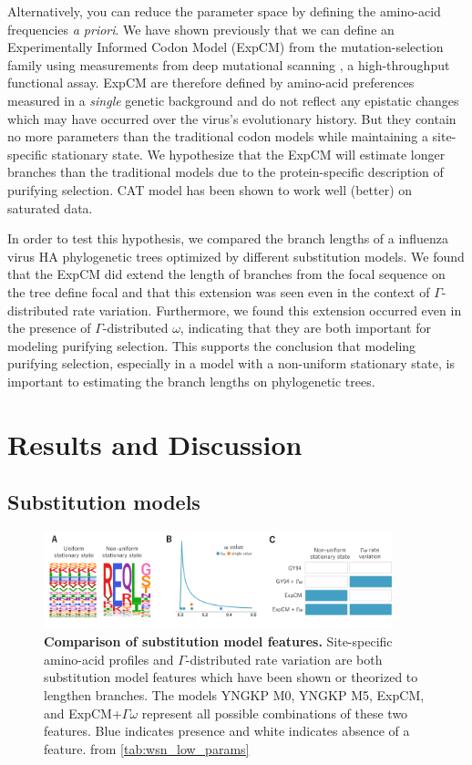 \documentclass[11pt]{article}
\newcommand\skhcomment[1]{{\color{cyan}#1}}
\begin{document}
Alternatively, you can reduce the parameter space by defining the amino-acid frequencies \textit{a priori}. 
We have shown previously that we can define an Experimentally Informed Codon Model (ExpCM) \citep{bloom2014experimentally,bloom2014informed} from the mutation-selection family using measurements from deep mutational scanning \citep{fowler2014deep}, a high-throughput functional assay. 
ExpCM are therefore defined by amino-acid preferences measured in a \textit{single} genetic background and do not reflect any epistatic changes which may have occurred over the virus's evolutionary history. 
But they contain no more parameters than the traditional codon models while maintaining a site-specific stationary state. 
We hypothesize that the ExpCM will estimate longer branches than the traditional models due to the protein-specific description of purifying selection. 
\skhcomment{CAT model has been shown to work well (better) on saturated data.}

In order to test this hypothesis, we compared the branch lengths of a influenza virus HA phylogenetic trees optimized by different substitution models. 
We found that the ExpCM did extend the length of branches from the focal sequence on the tree \skhcomment{define focal} and that this extension was seen even in the context of $\Gamma$-distributed rate variation. 
Furthermore, we found this extension occurred even in the presence of $\Gamma$-distributed $\omega$, indicating that they are both important for modeling purifying selection. 
This supports the conclusion that modeling purifying selection, especially in a model with a non-uniform stationary state, is important to estimating the branch lengths on phylogenetic trees. 

\section*{Results and Discussion}

\subsection*{Substitution models}

\begin{figure}[H]
\centerline{\includegraphics[width=0.90\textwidth]{figures/model_feature.pdf}}
\caption{\label{fig:model_feature}
\textbf{Comparison of substitution model features.}
Site-specific amino-acid profiles and $\Gamma$-distributed rate variation are both substitution model features which have been shown or theorized to lengthen branches. 
The models YNGKP M0, YNGKP M5, ExpCM, and ExpCM+$\Gamma\omega$ represent all possible combinations of these two features. 
Blue indicates presence and white indicates absence of a feature. 
from \ref{tab:wsn_low_params}
}
\end{figure}
\end{document}
